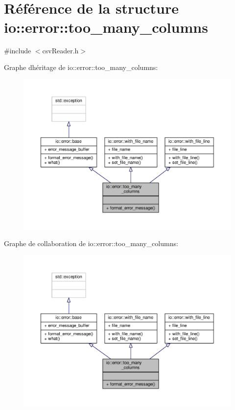 \hypertarget{structio_1_1error_1_1too__many__columns}{}\section{Référence de la structure io\+:\+:error\+:\+:too\+\_\+many\+\_\+columns}
\label{structio_1_1error_1_1too__many__columns}


{\ttfamily \#include $<$csv\+Reader.\+h$>$}



Graphe d\textquotesingle{}héritage de io\+:\+:error\+:\+:too\+\_\+many\+\_\+columns\+:\nopagebreak
\begin{figure}[H]
\begin{center}
\leavevmode
\includegraphics[width=350pt]{structio_1_1error_1_1too__many__columns__inherit__graph}
\end{center}
\end{figure}


Graphe de collaboration de io\+:\+:error\+:\+:too\+\_\+many\+\_\+columns\+:\nopagebreak
\begin{figure}[H]
\begin{center}
\leavevmode
\includegraphics[width=350pt]{structio_1_1error_1_1too__many__columns__coll__graph}
\end{center}
\end{figure}

